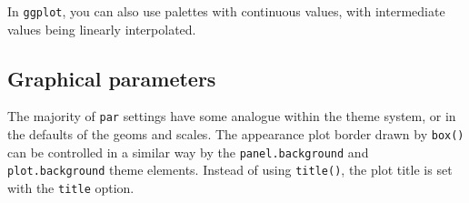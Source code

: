 \begin{Shaded}
\begin{Highlighting}[]
\NormalTok{(}\NormalTok{(}\NormalTok{))}
\NormalTok{(}\NormalTok{:}\NormalTok{, }\NormalTok{:}\NormalTok{, } \NormalTok{:}\NormalTok{, } \NormalTok{, } \NormalTok{)}

\NormalTok{(}\NormalTok{:}\NormalTok{, }\NormalTok{:}\NormalTok{, } \NormalTok{(}\NormalTok{:}\NormalTok{), } \NormalTok{(}\NormalTok{))}
\NormalTok{() +}\StringTok{ }\NormalTok{(} \NormalTok{(}\NormalTok{))}
\end{Highlighting}
\end{Shaded}

In \texttt{ggplot}, you can also use palettes with continuous values,
with intermediate values being linearly interpolated.

\begin{Shaded}
\begin{Highlighting}[]
\NormalTok{(}\NormalTok{:}\NormalTok{, }\NormalTok{:}\NormalTok{, } \NormalTok{:}\NormalTok{, } \NormalTok{(}\NormalTok{)) +}
\StringTok{  }\NormalTok{(} \NormalTok{(}\NormalTok{))}
\NormalTok{() +}
\StringTok{  }\NormalTok{(} \NormalTok{(}\NormalTok{))}
\end{Highlighting}
\end{Shaded}

\subsection{Graphical parameters}

The majority of \texttt{par} settings have some analogue within the
theme system, or in the defaults of the geoms and scales. The appearance
plot border drawn by \texttt{box()} can be controlled in a similar way
by the \texttt{panel.background} and \texttt{plot.background} theme
elements. Instead of using \texttt{title()}, the plot title is set with
the \texttt{title} option.

